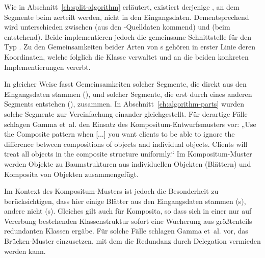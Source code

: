 \documentclass[../main/thesis.tex]{subfiles}
\begin{document}
Wie in Abschnitt~\ref{ch:split-algorithm} erläutert, existiert derjenige , an dem Segmente beim  zerteilt werden, nicht in den Eingangsdaten.
Dementsprechend wird unterschieden zwischen  (aus den \osm-Quelldaten kommend) und  (beim  entstehend).
Beide implementieren jedoch die gemeinsame Schnittstelle für den Typ .
Zu den Gemeinsamkeiten beider Arten von s gehören in erster Linie deren Koordinaten, welche folglich die Klasse  verwaltet und an die beiden konkreten Implementierungen vererbt.

In gleicher Weise fasst  Gemeinsamkeiten solcher Segmente, die direkt aus den Eingangsdaten stammen (), und solcher Segmente, die erst durch  eines anderen Segments entstehen (), zusammen.
In Abschnitt~\ref{ch:algorithm-parts} wurden solche Segmente zur Vereinfachung einander gleichgestellt.
Für derartige Fälle schlagen Gamma et~al. den Einsatz des Kompositum-Entwurfsmusters vor:
„Use the Composite pattern when [...] you want clients to be able to ignore the difference between compositions of objects and individual objects. Clients will treat all objects in the composite structure uniformly.“ 
Im Kompositum-Muster werden Objekte zu Baumstrukturen aus individuellen Objekten (Blättern) und Komposita von Objekten zusammengefügt.

Im Kontext des Kompositum-Musters ist jedoch die Besonderheit zu berücksichtigen, dass hier einige Blätter aus den Eingangsdaten stammen (s), andere nicht (s).
Gleiches gilt auch für Komposita, so dass sich in einer nur auf Vererbung bestehenden Klassenstruktur sofort eine Wucherung aus größtenteils redundanten Klassen ergäbe.
Für solche Fälle schlagen Gamma et~al. vor, das Brücken-Muster  einzusetzen, mit dem die Redundanz durch Delegation vermieden werden kann. 

\end{document}
